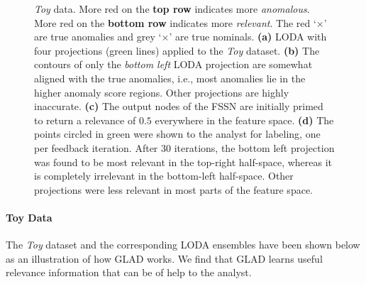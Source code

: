 \documentclass{article}
\begin{document}
\begin{figure}[h]
	\caption{\textit{Toy} data. More red on the \textbf{top row} indicates more \textit{anomalous}. More red on the \textbf{bottom row} indicates more \textit{relevant}. The red `$\times$' are true anomalies and grey `$\times$' are true nominals. {\bf (a)} LODA with four projections (green lines) applied to the \textit{Toy} dataset. {\bf (b)} The contours of only the \textit{bottom left} LODA projection are somewhat aligned with the true anomalies, i.e., most anomalies lie in the higher anomaly score regions. Other projections are highly inaccurate. {\bf (c)} The output nodes of the FSSN are initially primed to return a relevance of $0.5$ everywhere in the feature space. {\bf (d)} The points circled in green were shown to the analyst for labeling, one per feedback iteration. After $30$ iterations, the bottom left projection was found to be most relevant in the top-right half-space, whereas it is completely irrelevant in the bottom-left half-space. Other projections were less relevant in most parts of the feature space.}
	\label{fig:dataset}
\end{figure}

\paragraph{Toy Data} The \textit{Toy} dataset and the corresponding LODA ensembles have been shown below as an illustration of how GLAD works. We find that GLAD learns useful relevance information that can be of help to the analyst.
\end{document}
